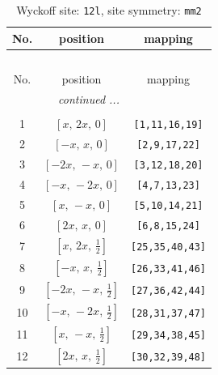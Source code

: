 \documentclass[fleqn,8pt]{jsarticle}
\begin{document}
\begin{longtable}{ccc}
\caption{Wyckoff site: {\tt 12l}, site symmetry: {\tt mm2}}
 \\
 \hline \hline
No. & position & mapping \\ \hline \endfirsthead

\multicolumn{2}{l}{\tablename\ \thetable{}} \\
 \hline \hline
No. & position & mapping \\ \hline \endhead

 \hline \hline
\multicolumn{2}{r}{\footnotesize\it continued ...} \\ \endfoot

 \hline \hline
\multicolumn{2}{r}{} \\ \endlastfoot

1 & $\left[ x,\, 2 x,\, 0 \right]$ & {\tt [1,11,16,19]} \\ \hline
2 & $\left[ - x,\, x,\, 0 \right]$ & {\tt [2,9,17,22]} \\ \hline
3 & $\left[ - 2 x,\, - x,\, 0 \right]$ & {\tt [3,12,18,20]} \\ \hline
4 & $\left[ - x,\, - 2 x,\, 0 \right]$ & {\tt [4,7,13,23]} \\ \hline
5 & $\left[ x,\, - x,\, 0 \right]$ & {\tt [5,10,14,21]} \\ \hline
6 & $\left[ 2 x,\, x,\, 0 \right]$ & {\tt [6,8,15,24]} \\ \hline
7 & $\left[ x,\, 2 x,\, \frac{1}{2} \right]$ & {\tt [25,35,40,43]} \\ \hline
8 & $\left[ - x,\, x,\, \frac{1}{2} \right]$ & {\tt [26,33,41,46]} \\ \hline
9 & $\left[ - 2 x,\, - x,\, \frac{1}{2} \right]$ & {\tt [27,36,42,44]} \\ \hline
10 & $\left[ - x,\, - 2 x,\, \frac{1}{2} \right]$ & {\tt [28,31,37,47]} \\ \hline
11 & $\left[ x,\, - x,\, \frac{1}{2} \right]$ & {\tt [29,34,38,45]} \\ \hline
12 & $\left[ 2 x,\, x,\, \frac{1}{2} \right]$ & {\tt [30,32,39,48]} \\
\end{longtable}
\renewcommand{\arraystretch}{1.2}
\end{document}
